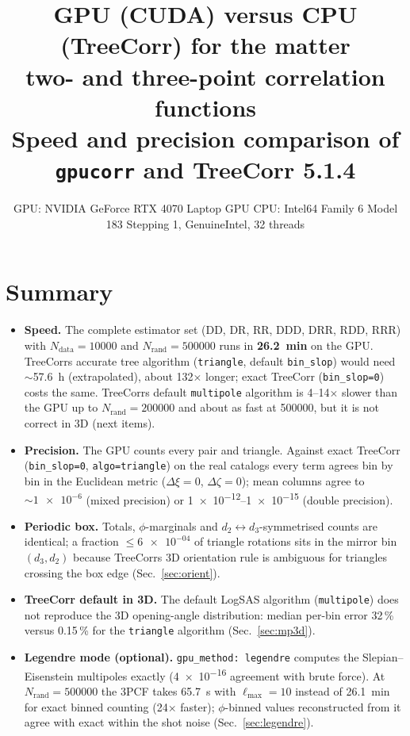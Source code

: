 \documentclass[11pt,a4paper]{article}
\title{\textbf{GPU (CUDA) versus CPU (TreeCorr) for the matter\\ two- and three-point correlation functions}\\[4pt]
\large Speed and precision comparison of \texttt{gpucorr} and TreeCorr 5.1.4}
\author{}
\date{GPU: NVIDIA GeForce RTX 4070 Laptop GPU \quad CPU: Intel64 Family 6 Model 183 Stepping 1, GenuineIntel, 32 threads}
\begin{document}
\maketitle

\section*{Summary}
\begin{itemize}
\item \textbf{Speed.} The complete estimator set (DD, DR, RR, DDD, DRR, RDD, RRR) with $N_\mathrm{data}=\num{10000}$ and $N_\mathrm{rand}=\num{500000}$ runs in \textbf{\SI{26.2}{min}} on the GPU. TreeCorr\textquotesingle s accurate tree algorithm (\texttt{triangle}, default \texttt{bin\_slop}) would need $\sim$\SI{57.6}{h} (extrapolated), about 132$\times$ longer; exact TreeCorr (\texttt{bin\_slop=0}) costs the same. TreeCorr\textquotesingle s default \texttt{multipole} algorithm is 4--14$\times$ slower than the GPU up to $N_\mathrm{rand}=\num{200000}$ and about as fast at \num{500000}, but it is not correct in 3D (next items).
\item \textbf{Precision.} The GPU counts every pair and triangle. Against exact TreeCorr (\texttt{bin\_slop=0}, \texttt{algo=triangle}) on the real catalogs every term agrees bin by bin in the Euclidean metric ($\Delta\xi=\num{0}$, $\Delta\zeta=\num{0}$); mean columns agree to $\sim\num{1e-6}$ (mixed precision) or \numrange{1e-12}{1e-15} (double precision).
\item \textbf{Periodic box.} Totals, $\phi$-marginals and $d_2\leftrightarrow d_3$-symmetrised counts are identical; a fraction $\le \num{6e-04}$ of triangle rotations sits in the mirror bin $(d_3,d_2)$ because TreeCorr\textquotesingle s 3D orientation rule is ambiguous for triangles crossing the box edge (Sec.~\ref{sec:orient}).
\item \textbf{TreeCorr default in 3D.} The default LogSAS algorithm (\texttt{multipole}) does not reproduce the 3D opening-angle distribution: median per-bin error 32\,\% versus 0.15\,\% for the \texttt{triangle} algorithm (Sec.~\ref{sec:mp3d}).
\item \textbf{Legendre mode (optional).} \texttt{gpu\_method: legendre} computes the Slepian--Eisenstein multipoles exactly (\num{4e-16} agreement with brute force). At $N_\mathrm{rand}=\num{500000}$ the 3PCF takes \SI{65.7}{s} with $\ell_\mathrm{max}=10$ instead of \SI{26.1}{min} for exact binned counting (24$\times$ faster); $\phi$-binned values reconstructed from it agree with exact within the shot noise (Sec.~\ref{sec:legendre}).
\end{itemize}
\end{document}
